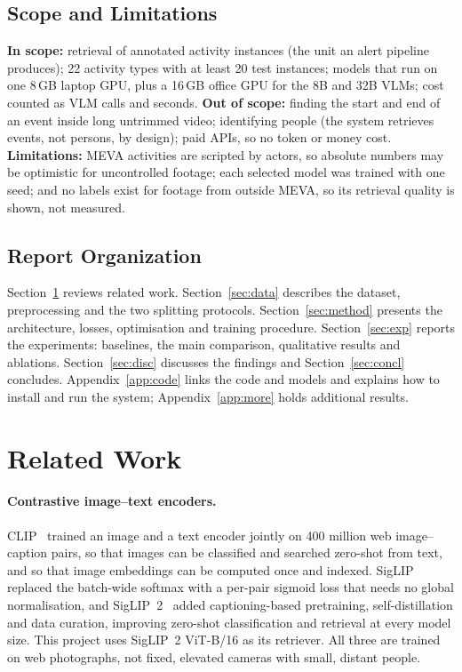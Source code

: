 \documentclass[11pt,a4paper]{article}
\begin{document}
\subsection{Scope and Limitations}
\textbf{In scope:} retrieval of annotated activity instances (the unit an alert pipeline produces); 22 activity
types with at least 20 test instances; models that run on one 8\,GB laptop GPU, plus a 16\,GB office GPU for the
8B and 32B VLMs; cost counted as VLM calls and seconds.
\textbf{Out of scope:} finding the start and end of an event inside long untrimmed video; identifying people (the
system retrieves events, not persons, by design); paid APIs, so no token or money cost.
\textbf{Limitations:} MEVA activities are scripted by actors, so absolute numbers may be optimistic for
uncontrolled footage; each selected model was trained with one seed; and no labels exist for footage from outside
MEVA, so its retrieval quality is shown, not measured.

\subsection{Report Organization}
Section~\ref{sec:related} reviews related work. Section~\ref{sec:data} describes the dataset, preprocessing and the
two splitting protocols. Section~\ref{sec:method} presents the architecture, losses, optimisation and training
procedure. Section~\ref{sec:exp} reports the experiments: baselines, the main comparison, qualitative results and
ablations. Section~\ref{sec:disc} discusses the findings and Section~\ref{sec:concl} concludes. Appendix~\ref{app:code}
links the code and models and explains how to install and run the system; Appendix~\ref{app:more} holds
additional results.

\section{Related Work}\label{sec:related}

\paragraph{Contrastive image--text encoders.} CLIP~\cite{clip} trained an image and a text encoder jointly on 400
million web image--caption pairs, so that images can be classified and searched zero-shot from text, and so that
image embeddings can be computed once and indexed. SigLIP~\cite{siglip} replaced the batch-wide softmax with a
per-pair sigmoid loss that needs no global normalisation, and SigLIP~2~\cite{siglip2} added captioning-based
pretraining, self-distillation and data curation, improving zero-shot classification and retrieval at every model
size. This project uses SigLIP~2 ViT-B/16 as its retriever. All three are trained on web photographs, not fixed,
elevated cameras with small, distant people.
\end{document}
